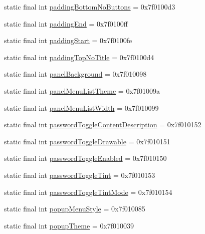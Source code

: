 \begin{CompactItemize}
\item 
static final int \hyperlink{classandroid_1_1support_1_1v4_1_1_r_1_1attr_5ae5c03050f1bbdc4a389a37c7eff11d}{paddingBottomNoButtons} = 0x7f0100d3
\item 
static final int \hyperlink{classandroid_1_1support_1_1v4_1_1_r_1_1attr_7f6f5b836aeb10a23f617941fb69594a}{paddingEnd} = 0x7f0100ff
\item 
static final int \hyperlink{classandroid_1_1support_1_1v4_1_1_r_1_1attr_b5d43600988608de10d25765dd9d51fc}{paddingStart} = 0x7f0100fe
\item 
static final int \hyperlink{classandroid_1_1support_1_1v4_1_1_r_1_1attr_1cfd408354d2004a75602bd8e5a81359}{paddingTopNoTitle} = 0x7f0100d4
\item 
static final int \hyperlink{classandroid_1_1support_1_1v4_1_1_r_1_1attr_ccdc6a4b0b6d4912e1f84d025cb1f450}{panelBackground} = 0x7f010098
\item 
static final int \hyperlink{classandroid_1_1support_1_1v4_1_1_r_1_1attr_73678d8d69d425cc5e4e655ba72bb96a}{panelMenuListTheme} = 0x7f01009a
\item 
static final int \hyperlink{classandroid_1_1support_1_1v4_1_1_r_1_1attr_7f2e342ff10e109e2f223697c5ed8578}{panelMenuListWidth} = 0x7f010099
\item 
static final int \hyperlink{classandroid_1_1support_1_1v4_1_1_r_1_1attr_5f2883607444e24cf76f04c6531158b2}{passwordToggleContentDescription} = 0x7f010152
\item 
static final int \hyperlink{classandroid_1_1support_1_1v4_1_1_r_1_1attr_4ddde9a3b68f61c91b34809139656822}{passwordToggleDrawable} = 0x7f010151
\item 
static final int \hyperlink{classandroid_1_1support_1_1v4_1_1_r_1_1attr_49b78da2ee304c23dbad49022a91bb97}{passwordToggleEnabled} = 0x7f010150
\item 
static final int \hyperlink{classandroid_1_1support_1_1v4_1_1_r_1_1attr_a3e15aedc0417f178ca1634c9868464b}{passwordToggleTint} = 0x7f010153
\item 
static final int \hyperlink{classandroid_1_1support_1_1v4_1_1_r_1_1attr_0ce1c460330a46123eff39278bef90be}{passwordToggleTintMode} = 0x7f010154
\item 
static final int \hyperlink{classandroid_1_1support_1_1v4_1_1_r_1_1attr_29ff6e708810965e91a22ace7fe9316b}{popupMenuStyle} = 0x7f010085
\item 
static final int \hyperlink{classandroid_1_1support_1_1v4_1_1_r_1_1attr_94400b57cffe4fbfe3647adbad35ccdc}{popupTheme} = 0x7f010039

\end{CompactItemize}
